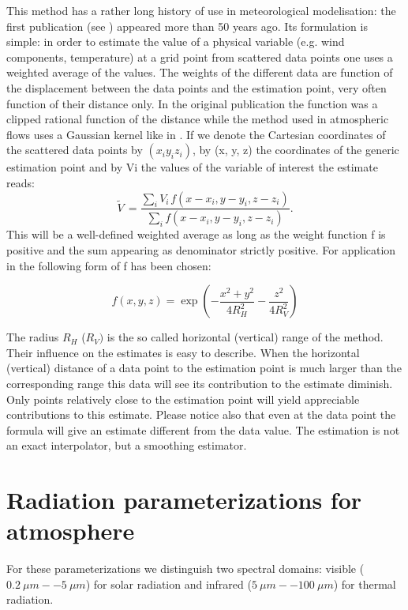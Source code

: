 This method has a rather long history of use in meteorological
modelisation: the first publication (see \cite{Cressman:1959}) appeared more than 50 years ago.
Its formulation is simple: in order to estimate the value of a physical variable ({e.g.} wind components, temperature)
at a grid point from scattered data points one uses a weighted average of the values.
The weights of the different data are function of the displacement between
the data points and the estimation point, very often function of their
distance only. In the original publication the function was a clipped
rational function of the distance while the method used in \CS
atmospheric flows uses a Gaussian kernel like in \cite{Barnes:1964}.
If we denote the Cartesian coordinates of the scattered data points by
$(x_{i}y_{i}z_{i})$, by (x, y, z) the coordinates of the generic estimation
point and by Vi the values of the variable of interest the estimate reads:
\begin{equation}
\tilde{V}\, =\frac{\sum\nolimits_i {V_{i\, }f(x-x_{i},y-y_{i},z-z_{i})}
}{\sum\nolimits_i {f(x-x_{i},y-y_{i},z-z_{i})} }.
\end{equation}
This will be a well-defined weighted average as long as the weight function
f is positive and the sum appearing as denominator strictly positive. For
application in \CS the following form of f has been chosen:

\begin{equation}
f\left( x,y,z \right)=
\exp\left(-\dfrac{x^{2}+y^{2}}{4R_{H}^{2}}-\frac{z^{2}}{4R_{V}^{2}}\right)
\end{equation}

The radius $R_{H}$ ($R_{V})$ is the so called horizontal (vertical) range
of the method. Their influence on the estimates is easy to describe. When
the horizontal (vertical) distance of a data point to the estimation point
is much larger than the corresponding range this data will see its
contribution to the estimate diminish. Only points relatively close to the
estimation point will yield appreciable contributions to this estimate.
Please notice also that even at the data point the formula will give an
estimate different from the data value. The estimation is not an exact
interpolator, but a smoothing estimator.

\section{Radiation parameterizations for atmosphere}

For these parameterizations we distinguish two spectral domains: visible
($\SI{0.2}{ \mu m} -- \SI{5}{\mu m}$) for solar radiation and infrared
($\SI{5}{\mu m} -- \SI{100}{ \mu m}$) for thermal radiation.

